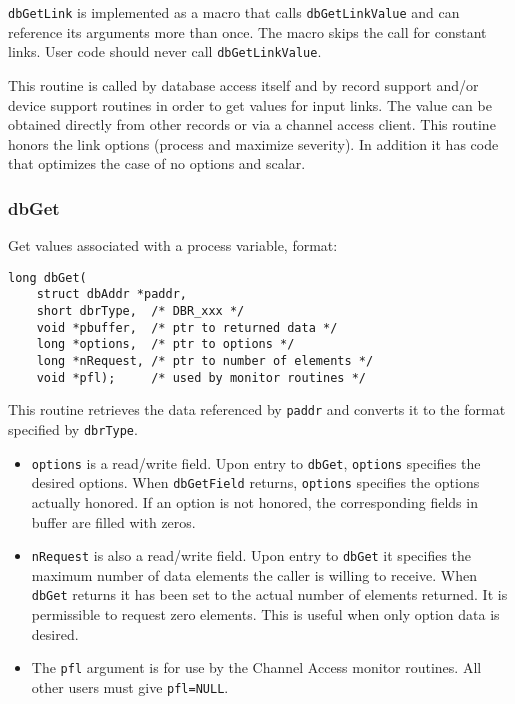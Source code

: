 \verb|dbGetLink| is implemented as a macro that calls \verb|dbGetLinkValue| and can reference its arguments more than once.
The macro skips the call for constant links.
User code should never call \verb|dbGetLinkValue|.

This routine is called by database access itself and by record support and/or device support routines in order to get values for input links.
The value can be obtained directly from other records or via a channel access client.
This routine honors the link options (process and maximize severity).
In addition it has code that optimizes the case of no options and scalar.

\subsubsection{dbGet}

Get values associated with a process variable, format:

\begin{verbatim}
long dbGet(
    struct dbAddr *paddr,
    short dbrType,  /* DBR_xxx */
    void *pbuffer,  /* ptr to returned data */
    long *options,  /* ptr to options */
    long *nRequest, /* ptr to number of elements */
    void *pfl);     /* used by monitor routines */
\end{verbatim}

This routine retrieves the data referenced by \verb|paddr| and converts it to the format specified by \verb|dbrType|.

\begin{itemize}
\item \verb|options| is a read/write field.
Upon entry to \verb|dbGet|, \verb|options| specifies the desired options.
When \verb|dbGetField| returns, \verb|options| specifies the options actually honored.
If an option is not honored, the corresponding fields in buffer are filled with zeros.

\item \verb|nRequest| is also a read/write field.
Upon entry to \verb|dbGet| it specifies the maximum number of data elements the 
caller is willing to receive.
When \verb|dbGet| returns it has been set to the actual number of elements returned.
It is permissible to request zero elements.
This is useful when only option data is desired.

\item The \verb|pfl| argument is for use by the Channel Access monitor routines.
All other users must give \verb|pfl=NULL|.

\end{itemize}

